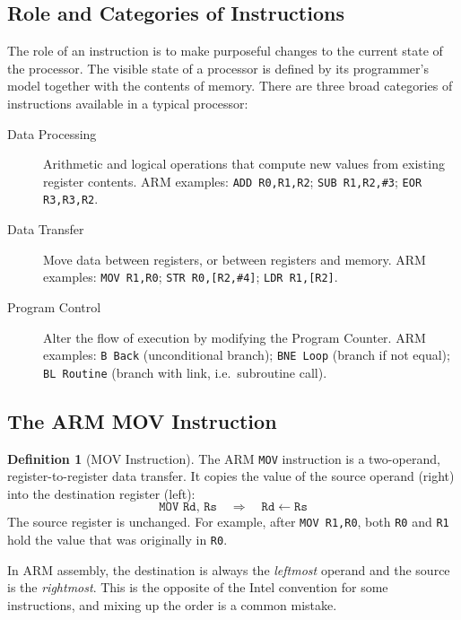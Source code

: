 \documentclass[11pt, a4paper, notitlepage]{report}
\theoremstyle{definition}
\newtheorem{definition}[theorem]{Definition}
\theoremstyle{remark}
\theoremstyle{definition}
\begin{document}
\subsection{Role and Categories of Instructions}

The role of an instruction is to make purposeful changes to the current state of the processor. The visible state of a processor is defined by its programmer's model together with the contents of memory. There are three broad categories of instructions available in a typical processor:

\begin{description}
  \item[Data Processing] Arithmetic and logical operations that compute new values from existing register contents. ARM examples: \texttt{ADD R0,R1,R2}; \texttt{SUB R1,R2,\#3}; \texttt{EOR R3,R3,R2}.
  \item[Data Transfer] Move data between registers, or between registers and memory. ARM examples: \texttt{MOV R1,R0}; \texttt{STR R0,[R2,\#4]}; \texttt{LDR R1,[R2]}.
  \item[Program Control] Alter the flow of execution by modifying the Program Counter. ARM examples: \texttt{B Back} (unconditional branch); \texttt{BNE Loop} (branch if not equal); \texttt{BL Routine} (branch with link, i.e.\ subroutine call).
\end{description}

\subsection{The ARM MOV Instruction}

\begin{definition}[MOV Instruction]
\label{def:mov}
The ARM \texttt{MOV} instruction is a two-operand, register-to-register data transfer. It copies the value of the source operand (right) into the destination register (left):
\[
  \texttt{MOV Rd, Rs} \quad\Longrightarrow\quad \texttt{Rd} \leftarrow \texttt{Rs}
\]
The source register is unchanged. For example, after \texttt{MOV R1,R0}, both \texttt{R0} and \texttt{R1} hold the value that was originally in \texttt{R0}.
\end{definition}

\begin{warning}[title={ARM Operand Order}]
In ARM assembly, the destination is always the \emph{leftmost} operand and the source is the \emph{rightmost}. This is the opposite of the Intel convention for some instructions, and mixing up the order is a common mistake.
\end{warning}
\end{document}
